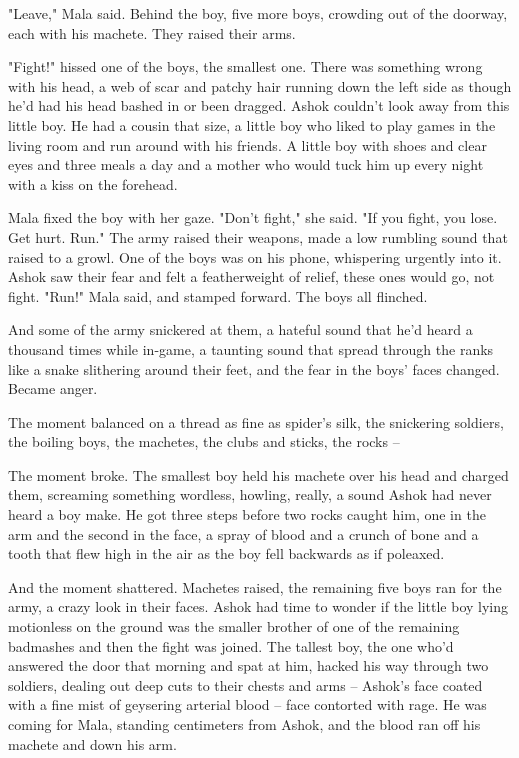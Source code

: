 "Leave," Mala said. Behind the boy, five more boys, crowding out of
the doorway, each with his machete. They raised their arms.

"Fight!" hissed one of the boys, the smallest one. There was
something wrong with his head, a web of scar and patchy hair
running down the left side as though he'd had his head bashed in or
been dragged. Ashok couldn't look away from this little boy. He had
a cousin that size, a little boy who liked to play games in the
living room and run around with his friends. A little boy with
shoes and clear eyes and three meals a day and a mother who would
tuck him up every night with a kiss on the forehead.

Mala fixed the boy with her gaze. "Don't fight," she said. "If you
fight, you lose. Get hurt. Run." The army raised their weapons,
made a low rumbling sound that raised to a growl. One of the boys
was on his phone, whispering urgently into it. Ashok saw their fear
and felt a featherweight of relief, these ones would go, not fight.
"Run!" Mala said, and stamped forward. The boys all flinched.

And some of the army snickered at them, a hateful sound that he'd
heard a thousand times while in-game, a taunting sound that spread
through the ranks like a snake slithering around their feet, and
the fear in the boys' faces changed. Became anger.

The moment balanced on a thread as fine as spider's silk, the
snickering soldiers, the boiling boys, the machetes, the clubs and
sticks, the rocks --

The moment broke. The smallest boy held his machete over his head
and charged them, screaming something wordless, howling, really, a
sound Ashok had never heard a boy make. He got three steps before
two rocks caught him, one in the arm and the second in the face, a
spray of blood and a crunch of bone and a tooth that flew high in
the air as the boy fell backwards as if poleaxed.

And the moment shattered. Machetes raised, the remaining five boys
ran for the army, a crazy look in their faces. Ashok had time to
wonder if the little boy lying motionless on the ground was the
smaller brother of one of the remaining badmashes and then the
fight was joined. The tallest boy, the one who'd answered the door
that morning and spat at him, hacked his way through two soldiers,
dealing out deep cuts to their chests and arms -- Ashok's face
coated with a fine mist of geysering arterial blood -- face
contorted with rage. He was coming for Mala, standing centimeters
from Ashok, and the blood ran off his machete and down his arm.

